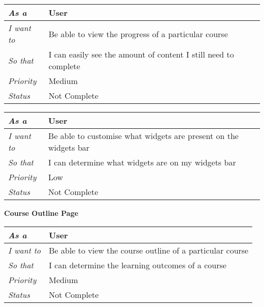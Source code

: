 \begin{table}[h!]
    \begin{tabular}{|l|l|}
        \hline
        \textit{As a} & User \\ \hline
        \textit{I want to} & Be able to view the progress of a particular course \\ \hline
        \textit{So that} & I can easily see the amount of content I still need to complete \\ \hline
        \textit{Priority} & {\color[HTML]{FE996B} Medium} \\ \hline
        \textit{Status} & Not Complete \\ \hline
    \end{tabular}
\end{table}

\begin{table}[h!]
    \begin{tabular}{|l|l|}
        \hline
        \textit{As a} & User \\ \hline
        \textit{I want to} & Be able to customise what widgets are present on the widgets bar \\ \hline
        \textit{So that} & I can determine what widgets are on my widgets bar \\ \hline
        \textit{Priority} & {\color[HTML]{FE996B} Low} \\ \hline
        \textit{Status} & Not Complete \\ \hline
    \end{tabular}
\end{table}

\pagebreak
\FloatBarrier
\textbf{Course Outline Page}
\FloatBarrier
\begin{table}[h!]
    \begin{tabular}{|l|l|}
        \hline
        \textit{As a} & User \\ \hline
        \textit{I want to} & Be able to view the course outline of a particular course \\ \hline
        \textit{So that} & I can determine the learning outcomes of a course \\ \hline
        \textit{Priority} & {\color[HTML]{FE996B} Medium} \\ \hline
        \textit{Status} & Not Complete \\ \hline
    \end{tabular}
\end{table}

